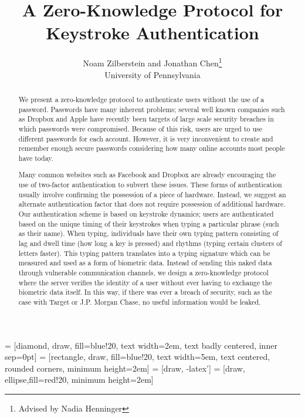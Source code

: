 \documentclass[11pt]{article}
\begin{document}
 = [diamond, draw, fill=blue!20, 
    text width=2em, text badly centered, inner sep=0pt]
 = [rectangle, draw, fill=blue!20, 
    text width=5em, text centered, rounded corners, minimum height=2em]
 = [draw, -latex']
 = [draw, ellipse,fill=red!20,
    minimum height=2em]

\title{A Zero-Knowledge Protocol for Keystroke Authentication}

\author{Noam Zilberstein and Jonathan Chen\thanks{Advised by Nadia Henninger} \\
University of Pennsylvania
}
\maketitle

\begin{abstract}
We present a zero-knowledge protocol to authenticate users without the use of a password. Passwords have many inherent problems; several well known companies such as Dropbox and Apple have recently been targets of large scale security breaches in which passwords were compromised. Because of this risk, users are urged to use different passwords for each account. However, it is very inconvenient to create and remember enough secure passwords considering how many online accounts most people have today.

Many common websites such as Facebook and Dropbox are already encouraging the use of two-factor authentication to subvert these issues. These forms of authentication usually involve confirming the possession of a piece of hardware. Instead, we suggest an alternate authentication factor that does not require possession of additional hardware. Our authentication scheme is based on keystroke dynamics; users are authenticated based on the unique timing of their keystrokes when typing a particular phrase (such as their name). When typing, individuals have their own typing pattern consisting of lag and dwell time (how long a key is pressed) and rhythms (typing certain clusters of letters faster).  This typing pattern translates into a typing signature which can be measured and used as a form of biometric data. Instead of sending this naked data through vulnerable communication channels, we design a zero-knowledge protocol where the server verifies the identity of a user without ever having to exchange the biometric data itself. In this way, if there was ever a breach of security, such as the case with Target or J.P. Morgan Chase, no useful information would be leaked.
\end{abstract}
\end{document}
